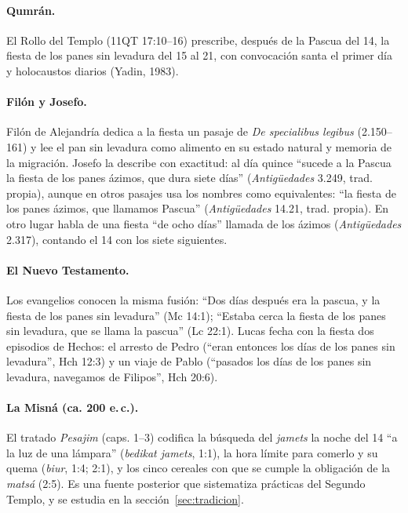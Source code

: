 \documentclass[11pt,letterpaper]{article}
\begin{document}
\paragraph{Qumrán.} El Rollo del Templo (11QT 17:10--16) prescribe, después de la Pascua del 14, la fiesta de los panes sin levadura del 15 al 21, con convocación santa el primer día y holocaustos diarios (Yadin, 1983).

\paragraph{Filón y Josefo.} Filón de Alejandría dedica a la fiesta un pasaje de \emph{De specialibus legibus} (2.150--161) y lee el pan sin levadura como alimento en su estado natural y memoria de la migración. Josefo la describe con exactitud: al día quince ``sucede a la Pascua la fiesta de los panes ázimos, que dura siete días'' (\emph{Antigüedades} 3.249, trad. propia), aunque en otros pasajes usa los nombres como equivalentes: ``la fiesta de los panes ázimos, que llamamos Pascua'' (\emph{Antigüedades} 14.21, trad. propia). En otro lugar habla de una fiesta ``de ocho días'' llamada de los ázimos (\emph{Antigüedades} 2.317), contando el 14 con los siete siguientes.

\paragraph{El Nuevo Testamento.} Los evangelios conocen la misma fusión: ``Dos días después era la pascua, y la fiesta de los panes sin levadura'' (Mc 14:1); ``Estaba cerca la fiesta de los panes sin levadura, que se llama la pascua'' (Lc 22:1). Lucas fecha con la fiesta dos episodios de Hechos: el arresto de Pedro (``eran entonces los días de los panes sin levadura'', Hch 12:3) y un viaje de Pablo (``pasados los días de los panes sin levadura, navegamos de Filipos'', Hch 20:6).

\paragraph{La Misná (ca. 200 e.\,c.).} El tratado \emph{Pesajim} (caps. 1--3) codifica la búsqueda del \emph{jamets} la noche del 14 ``a la luz de una lámpara'' (\emph{bedikat jamets}, 1:1), la hora límite para comerlo y su quema (\emph{biur}, 1:4; 2:1), y los cinco cereales con que se cumple la obligación de la \emph{matsá} (2:5). Es una fuente posterior que sistematiza prácticas del Segundo Templo, y se estudia en la sección~\ref{sec:tradicion}.
\end{document}
